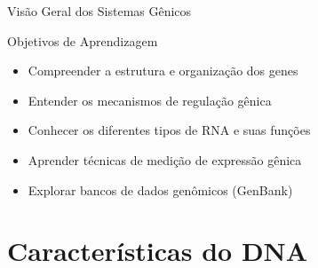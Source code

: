 \begin{frame}{Visão Geral dos Sistemas Gênicos}
\begin{block}{Objetivos de Aprendizagem}
\begin{itemize}
    \item Compreender a estrutura e organização dos genes
    \item Entender os mecanismos de regulação gênica
    \item Conhecer os diferentes tipos de RNA e suas funções
    \item Aprender técnicas de medição de expressão gênica
    \item Explorar bancos de dados genômicos (GenBank)
\end{itemize}
\end{block}

\vspace{0.3cm}

\end{frame}

\section{Características do DNA}

